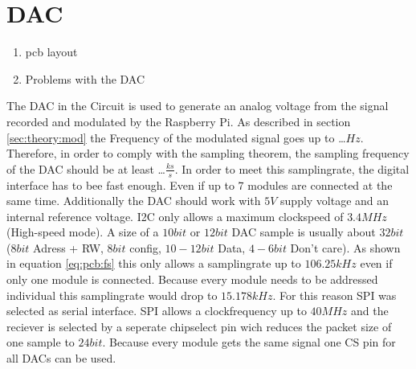 \section{DAC}

\begin{enumerate}
  \item pcb layout
  \item Problems with the DAC
\end{enumerate}

The DAC in the Circuit is used to generate an analog voltage from the signal recorded and modulated by the Raspberry Pi.\p
%
As described in section \ref{sec:theory:mod} the Frequency of the modulated signal goes up to \dots$Hz$.
Therefore, in order to comply with the sampling theorem, the sampling frequency of the DAC should be at least \dots$\frac{ks}{s}$. In order to meet this samplingrate, the digital interface has to bee fast enough. Even if up to 7 modules are connected at the same time. Additionally the DAC should work with $5V$ supply voltage and an internal reference voltage.\p
%
I2C only allows a maximum clockspeed of $3.4MHz$ (High-speed mode). A size of a $10bit$ or $12bit$ DAC sample is usually about $32bit$ ($8bit$ Adress + RW, $8bit$ config, $10 - 12bit$ Data, $4 - 6bit$ Don't care). As shown in equation \ref{eq:pcb:fs} this only allows a samplingrate up to $106.25kHz$ even if only one module is connected. Because every module needs to be addressed individual this samplingrate would drop to $15.178kHz$. For this reason SPI was selected as serial interface. SPI allows a clockfrequency up to $40MHz$ and the reciever is selected by a seperate chipselect pin wich reduces the packet size of one sample to $24bit$. Because every module gets the same signal one CS pin for all DACs can be used.\p
%
